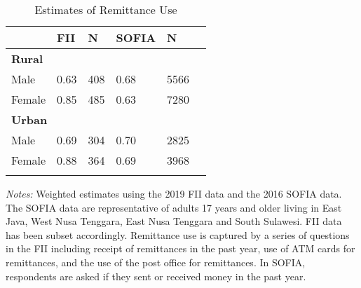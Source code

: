 \begin{table}[H] \begin{adjustbox}{max width=1.3\textwidth} \begin{threeparttable} \caption{Estimates of Remittance Use} \label{remitcompate} {\begin{tabular}{l*{1}{lllll}} \hline \toprule &{FII}&{N}&{SOFIA}&{N} \\ \midrule \multicolumn{5}{l}{\textbf{Rural}} \\
\hline
Male            &     0.63&      408&     0.68&     5566\\
Female          &     0.85&      485&     0.63&     7280\\
\multicolumn{5}{l}{\textbf{Urban}} \\
Male            &     0.69&      304&     0.70&     2825\\
Female          &     0.88&      364&     0.69&     3968\\
 \bottomrule \addlinespace[1.5ex] \end{tabular}} \begin{tablenotes}[flushleft]  \small \item \emph{Notes:} Weighted estimates using the 2019 FII data and the 2016 SOFIA data. The SOFIA data are representative of adults 17 years and older living in East Java, West Nusa Tenggara, East Nusa Tenggara and South Sulawesi. FII data has been subset accordingly. Remittance use is captured by a series of questions in the FII including receipt of remittances in the past year, use of ATM cards for remittances, and the use of the post office for remittances. In SOFIA, respondents are asked if they sent or received money in the past year. \end{tablenotes} \end{threeparttable} \end{adjustbox} \end{table} \vspace*{-5mm}
